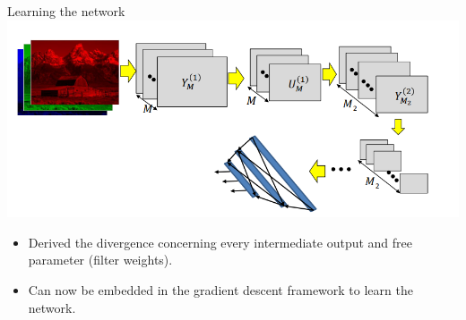 \documentclass[default, aspectratio=169]{beamer}
\begin{document}
	
	
	\begin{frame}{Learning the network}
		\centering
		\includegraphics[keepaspectratio, scale=0.6]{pic/training6.png}
		\smallskip
		
		\begin{itemize}
			\item Derived the divergence concerning every intermediate output and free parameter (filter weights).
			\item Can now be embedded in the gradient descent framework to learn the network.
		\end{itemize}
		
		
		
	\end{frame}	
	
\end{document}
